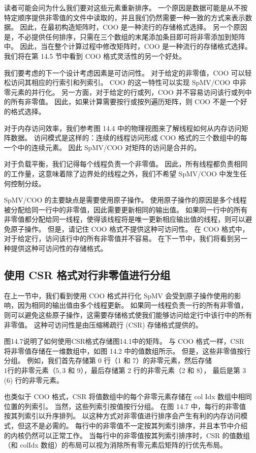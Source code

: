 读者可能会问为什么我们要对这些元素重新排序。 一个原因是数据可能是从不按特定顺序提供非零值的文件中读取的，并且我们仍然需要一种一致的方式来表示数据。 因此，在最初构造矩阵时，$\mathrm{COO}$ 是一种流行的存储格式选择。 另一个原因是，不必提供任何排序，只需在三个数组的末尾添加条目即可将非零添加到矩阵中。 因此，当在整个计算过程中修改矩阵时，$\mathrm{COO}$ 是一种流行的存储格式选择。 我们将在第 14.5 节中看到 COO 格式灵活性的另一个好处。

我们要考虑的下一个设计考虑因素是可访问性。 对于给定的非零值，COO 可以轻松访问其相应的行索引和列索引。 $\mathrm{COO}$ 的这一特性可以实现 SpMV/COO 中非零元素的并行化。 另一方面，对于给定的行或列，COO 并不容易访问该行或列中的所有非零值。 因此，如果计算需要按行或按列遍历矩阵，则 $\mathrm{COO}$ 不是一个好的格式选择。

对于内存访问效率，我们参考图 14.4 中的物理视图来了解线程如何从内存访问矩阵数据。 访问模式是这样的：连续的线程访问形成 COO 格式的三个数组中的每一个中的连续元素。 因此 SpMV/COO 对矩阵的访问是合并的。

对于负载平衡，我们记得每个线程负责一个非零值。 因此，所有线程都负责相同的工作量，这意味着除了边界处的线程之外，我们不希望 SpMV/COO 中发生任何控制分歧。

SpMV/COO 的主要缺点是需要使用原子操作。 使用原子操作的原因是多个线程被分配给同一行中的非零值，因此需要更新相同的输出值。 如果同一行中的所有非零值都分配给同一线程，使得该线程将是唯一更新相应输出值的线程，则可以避免原子操作。 但是，请记住 $\mathrm{COO}$ 格式不提供这种可访问性。 在 $\mathrm{COO}$ 格式中，对于给定行，访问该行中的所有非零值并不容易。 在下一节中，我们将看到另一种提供这种可访问性的存储格式。

\subsection{使用 CSR 格式对行非零值进行分组}
在上一节中，我们看到使用 COO 格式并行化 SpMV 会受到原子操作使用的影响，因为相同的输出值由多个线程更新。 如果同一线程负责一行的所有非零值，则可以避免这些原子操作，这需要存储格式使我们能够访问给定行中该行中的所有非零值。 这种可访问性是由压缩稀疏行 (CSR) 存储格式提供的。

图14.7说明了如何使用CSR格式存储图14.1中的矩阵。 与 COO 格式一样，CSR 将非零值存储在一维数组中，如图 14.2 中的值数组所示。 但是，这些非零值按行分组。 例如，我们首先存储第 0 行（1 和 7）的非零元素，然后存储 $1 行的非零元素（5,3$ 和 9），最后存储第 2 行的非零元素（2 和 8）， 最后是第 3 (6) 行的非零元素。

也类似于 $\mathrm{COO}$ 格式，CSR 将值数组中的每个非零元素存储在 col Idx 数组中相同位置的列索引。 当然，这些列索引按值按行分组。 在图 14.7 中，每行的非零值按其列索引以升序排列。 以这种方式对非零值进行排序会产生有利的内存访问模式，但这不是必需的。 每行中的非零值不一定按其列索引排序，并且本节中介绍的内核仍然可以正常工作。 当每行中的非零值按其列索引排序时，CSR 的值数组（和 colIdx 数组）的布局可以视为消除所有零元素后矩阵的行优先布局。

